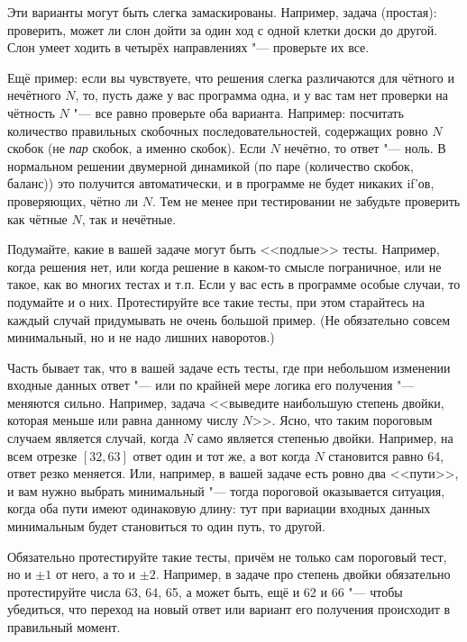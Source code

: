 Эти варианты могут быть слегка замаскированы. 
Например, задача (простая): проверить, может ли слон дойти за один ход с одной клетки доски до другой.
Слон умеет ходить в четырёх направлениях "--- проверьте их все.

Ещё пример: если вы чувствуете, что решения слегка различаются для чётного и нечётного $N$, то, пусть даже у вас программа одна,
и у вас там нет проверки на чётность $N$ "--- все равно проверьте оба варианта. 
Например: посчитать количество правильных скобочных последовательностей, содержащих ровно $N$ скобок (не \textit{пар} скобок, а именно скобок).
Если $N$ нечётно, то ответ "--- ноль. 
В нормальном решении двумерной динамикой (по паре (количество скобок, баланс)) это получится автоматически, и в программе не будет никаких if'ов,
проверяющих, чётно ли $N$. Тем не менее при тестировании не забудьте проверить как чётные $N$, так и нечётные.

Подумайте, какие в вашей задаче могут быть <<подлые>> тесты. 
Например, когда решения нет, или когда решение в каком-то смысле пограничное, или не такое, как во многих тестах и т.п.
Если у вас есть в программе особые случаи, то подумайте и о них. 
Протестируйте все такие тесты, при этом старайтесь на каждый случай придумывать не очень большой пример. 
(Не обязательно совсем минимальный, но и не надо лишних наворотов.)

Часть бывает так, что в вашей задаче есть тесты, где при небольшом изменении входные данных ответ "--- или по крайней мере логика его получения "--- меняются сильно.
Например, задача <<выведите наибольшую степень двойки, которая меньше или равна данному числу $N$>>. 
Ясно, что таким пороговым случаем является случай, когда $N$ само является степенью двойки. 
Например, на всем отрезке $[32,63]$ ответ один и тот же, а вот когда $N$ становится равно 64, ответ резко меняется.
Или, например, в вашей задаче есть ровно два <<пути>>, и вам нужно выбрать минимальный "--- тогда пороговой оказывается ситуация,
когда оба пути имеют одинаковую длину: тут при вариации входных данных минимальным будет становиться то один путь, то другой.

Обязательно протестируйте такие тесты, причём не только сам пороговый тест, но и $\pm 1$ от него, а то и $\pm 2$. 
Например, в задаче про степень двойки обязательно протестируйте числа 63, 64, 65, а может быть, ещё и 62 и 66 "--- 
чтобы убедиться, что переход на новый ответ или вариант его получения происходит в правильный момент.

